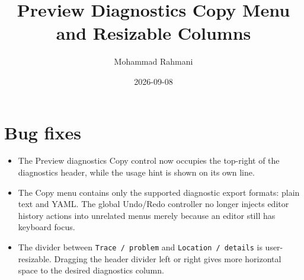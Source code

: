 \documentclass[a4paper]{article}
\title{Preview Diagnostics Copy Menu and Resizable Columns}
\date{2026-09-08}
\author{Mohammad Rahmani}
\begin{document}
   \maketitle

   \section{Bug fixes}

   \begin{itemize}
      \item The Preview diagnostics Copy control now occupies the top-right of
      the diagnostics header, while the usage hint is shown on its own line.
      \item The Copy menu contains only the supported diagnostic export formats:
      plain text and YAML. The global Undo/Redo controller no longer injects
      editor history actions into unrelated menus merely because an editor still
      has keyboard focus.
      \item The divider between \texttt{Trace / problem} and
      \texttt{Location / details} is user-resizable. Dragging the header divider
      left or right gives more horizontal space to the desired diagnostics column.
   \end{itemize}

   
   
\end{document}
